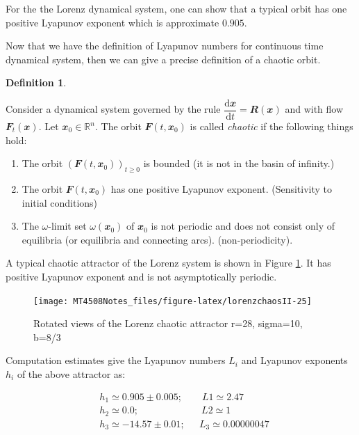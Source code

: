 \documentclass[
  a4paper,
  oneside,
  final]{krantz}
\providecommand{\tightlist}{%
  \setlength{\itemsep}{0pt}\setlength{\parskip}{0pt}}
\newcommand{\R}{\mathbb{R}}
\renewcommand{\d}{\mathrm{d}}
\renewcommand{\v}[1]{{\mathbfit{#1}}}
\newcommand{\der}[2]{\dfrac{\d #1}{\d #2}}
\theoremstyle{definition}
\newtheorem{definition}{Definition}[chapter]
\theoremstyle{definition}
\theoremstyle{definition}
\theoremstyle{definition}
\theoremstyle{remark}
\begin{document}
For the the Lorenz dynamical system, one can show that a typical orbit
has one positive Lyapunov exponent which is approximate \(0.905\).

Now that we have the definition of Lyapunov numbers for continuous time
dynamical system, then we can give a precise definition of a chaotic
orbit.

\begin{definition}
\protect\hypertarget{def:chaotic-orbit-cont}{}\label{def:chaotic-orbit-cont}

Consider a dynamical system governed by the rule
\(\der{\v{x}}{t} = \v{R}(\v{x})\) and with flow \(\v{F}_{t}(\v{x})\). Let
\(\v{x}_{0} \in \R^{n}\). The orbit \(\v{F}(t, \v{x}_{0})\) is called
\emph{chaotic} if the following things hold:

\begin{enumerate}
\def\labelenumi{\arabic{enumi}.}
\tightlist
\item
  The orbit \((\v{F}(t, \v{x}_{0}))_{t \ge 0}\) is bounded (it is not in
  the basin of infinity.)
\item
  The orbit \(\v{F}(t, \v{x}_{0})\) has one positive Lyapunov exponent.
  (Sensitivity to initial conditions)
\item
  The \(\omega\)-limit set \(\omega(\v{x}_{0})\) of \(\v{x}_{0}\) is not
  periodic and does not consist only of equilibria (or equilibria and
  connecting arcs). (non-periodicity).
\end{enumerate}

\end{definition}

A typical chaotic attractor of the Lorenz system is shown in Figure
\ref{fig:lorenzchaosII}. It has positive Lyapunov exponent and is not
asymptotically periodic.

\begin{figure}

{\centering \texttt{[image: MT4508Notes\_files/figure-latex/lorenzchaosII-25]} 

}

\caption{Rotated views of the Lorenz chaotic attractor r=28, sigma=10, b=8/3}\label{fig:lorenzchaosII}
\end{figure}

Computation estimates give the Lyapunov numbers \(L_i\) and Lyapunov
exponents \(h_i\) of the above attractor as:

\begin{align*}
&h_1 \simeq 0.905 \pm 0.005; \qquad L1 \simeq 2.47 \\
&h_2 \simeq 0.0; \quad \qquad \qquad \quad \ \ L2 \simeq 1 \\
    &h_3 \simeq  -14.57 \pm 0.01; \quad \ \ L_3 \simeq 0.00000047
\end{align*}
\end{document}
